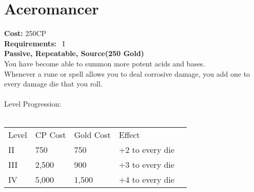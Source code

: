 \section{Aceromancer}\label{perk:aceromancer}
\textbf{Cost:} 250CP\\
\textbf{Requirements:}~ I\\
\textbf{Passive, Repeatable, Source(250 Gold)}\\
You have become able to summon more potent acids and bases.\\
Whenever a rune or spell allows you to deal corrosive damage, you add one to every damage die that you roll.\\
\\
Level Progression:\\
\\
\begin{tabular}{l | l | l | l | l}
    Level & CP Cost & Gold Cost &  Effect\\
    II & 750 & 750 & +2 to every die\\
    III & 2,500 & 900 & +3 to every die\\
    IV & 5,000 & 1,500 & +4 to every die\\
\end{tabular}